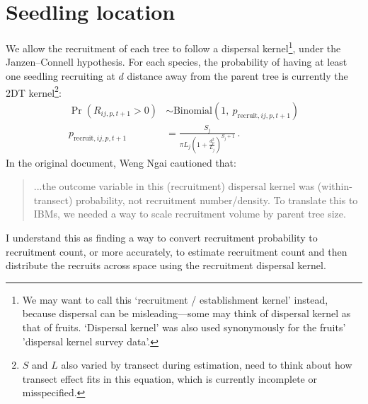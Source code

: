 \documentclass[12pt,a4paper]{article}
\begin{document}
\section{Seedling location}
We allow the recruitment of each tree to follow a dispersal kernel\footnote{We may want to call this `recruitment / establishment kernel' instead, because dispersal can be misleading---some may think of dispersal kernel as that of fruits. `Dispersal kernel' was also used synonymously for the fruits' 'dispersal kernel survey data'.}, under the Janzen--Connell hypothesis. For each species, the probability of having at least one seedling recruiting at $d$ distance away from the parent tree is currently the 2DT kernel\footnote{$S$ and $L$ also varied by transect during estimation, need to think about how transect effect fits in this equation, which is currently incomplete or misspecified.}:
\begin{align}
\Pr(R_{ij,p,t+1} > 0) &\sim \text{Binomial}(1,~p_{\text{recruit},ij,p,t+1}) \\
p_{\text{recruit},ij,p,t+1} &= \frac{S_j}{\pi L_j (1 + \frac{d_p^2}{L_j})^{S_j+1}} \,.
\end{align}
In the original document, Weng Ngai cautioned that:
\begin{quote}
...the outcome variable in this (recruitment) dispersal kernel was (within-transect) probability, not recruitment number/density. To translate this to IBMs, we needed a way to scale recruitment volume by parent tree size.
\end{quote}
I understand this as finding a way to convert recruitment probability to recruitment count, or more accurately, to estimate recruitment count and then distribute the recruits across space using the recruitment dispersal kernel. 
\end{document}
